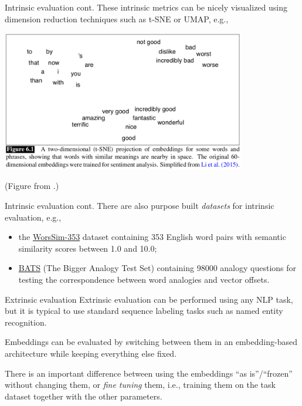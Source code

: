 \documentclass[style=upen, size=14pt]{powerdot}
\newcommand{\gold}{\color{arany}}
\theoremstyle{definition}
\begin{document}
\begin{slide}[toc=]{Intrinsic evaluation cont.}
  These intrinsic metrics can be nicely visualized using dimension reduction
  techniques such as t-SNE or UMAP, e.g., 
  \begin{center}
    \includegraphics[width=0.8\textwidth]{figures/w2v_tsne.eps}
    
    (\footnotesize Figure from \citet[ch. 6]{jurafsky2019speech}.)
  \end{center}  
\end{slide}

\begin{slide}[toc=]{Intrinsic evaluation cont.}
  There are also purpose built \emph{datasets} for intrinsic evaluation, e.g.,
  \begin{itemize}
  \item the
    \href{http://alfonseca.org/eng/research/wordsim353.html}{WorsSim-353}
    dataset containing 353 English word pairs with semantic similarity scores
    between 1.0 and 10.0;
  \item \href{https://vecto.space/projects/BATS/}{BATS} (The Bigger Analogy Test
    Set) containing 98000 analogy questions for testing the correspondence
    between word analogies and vector offsets.
  \end{itemize}
\end{slide}

\begin{slide}[toc=Extrinsic]{Extrinsic evaluation}
  Extrinsic evaluation can be performed using any NLP task, but it is typical to
  use standard sequence labeling tasks such as named entity recognition.

  Embeddings can be evaluated by switching between them in an embedding-based
  architecture while keeping everything else fixed.\bigskip

  There is an important difference between using the embeddings ``as is''/``frozen''
  without changing them, or \emph{\gold fine tuning} them, i.e., training them
  on the task dataset together with the other parameters.
\end{slide}
\end{document}
